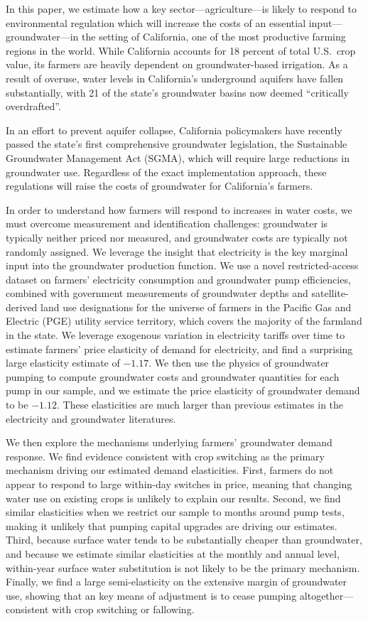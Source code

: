 %
%
In this paper, we estimate how a key sector---agriculture---is likely to respond to environmental regulation which will increase the costs of an essential input---groundwater---in the setting of California, one of the most productive farming regions in the world. While California accounts for 18 percent of total U.S.\ crop value, its farmers are heavily dependent on groundwater-based irrigation. As a result of overuse, water levels in California's underground aquifers have fallen substantially, with 21 of the state's groundwater basins now deemed ``critically overdrafted''.

In an effort to prevent aquifer collapse, California policymakers have recently passed the state's first comprehensive groundwater legislation, the Sustainable Groundwater Management Act (SGMA), which will require large reductions in groundwater use. Regardless of the exact implementation approach, these regulations will raise the costs of groundwater for California's farmers.

In order to understand how farmers will respond to increases in water costs, we must overcome measurement and identification challenges: groundwater is typically neither priced nor measured, and groundwater costs are typically not randomly assigned. We leverage the insight that electricity is the key marginal input into the groundwater production function. We use a novel restricted-access dataset on farmers' electricity consumption and groundwater pump efficiencies, combined with government measurements of groundwater depths and satellite-derived land use designations for the universe of farmers in the Pacific Gas and Electric (PGE) utility service territory, which covers the majority of the farmland in the state. We leverage exogenous variation in electricity tariffs over time to estimate farmers' price elasticity of demand for electricity, and find a surprising large elasticity estimate of $-1.17$. We then use the physics of groundwater pumping to compute groundwater costs and groundwater quantities for each pump in our sample, and we estimate the price elasticity of groundwater demand to be $-1.12$. These elasticities are much larger than previous estimates in the electricity and groundwater literatures.

We then explore the mechanisms underlying farmers' groundwater demand response. We find evidence consistent with crop switching as the primary mechanism driving our estimated demand elasticities. First, farmers do not appear to respond to large within-day switches in price, meaning that changing water use on existing crops is unlikely to explain our results. Second, we find similar elasticities when we restrict our sample to months around pump tests, making it unlikely that pumping capital upgrades are driving our estimates. Third, because surface water tends to be substantially cheaper than groundwater, and because we estimate similar elasticities at the monthly and annual level, within-year surface water substitution is not likely to be the primary mechanism. Finally, we find a large semi-elasticity on the extensive margin of groundwater use, showing that an key means of adjustment is to cease pumping altogether---consistent with crop switching or fallowing.

